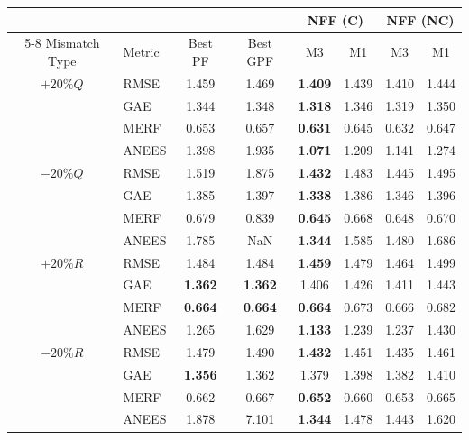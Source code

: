 \begin{Table}[ht]
	\caption{Performance under $\pm 20\%$ model mismatches. Comparison between the best PF/GPF and NFF ($L=1000$).}
	\label{tab:full_mismatch_results_v2}
	\footnotesize
	\setlength{\tabcolsep}{5pt}
	\begin{tabular}{|c|l|c|c|cc|cc|}
		\hline
		& & & & \multicolumn{2}{c|}{NFF (C)} & \multicolumn{2}{c|}{NFF (NC)} \\ \cline{5-8}
		Mismatch Type & Metric & Best PF & Best GPF & M3  & M1  & M3  & M1  \\ \hline
		
		{$+20\% Q$}
		& RMSE  & 1.459 & 1.469 & \textbf{1.409} & 1.439 & 1.410 & 1.444 \\
		& GAE   & 1.344 & 1.348 & \textbf{1.318} & 1.346 & 1.319 & 1.350 \\
		& MERF  & 0.653 & 0.657 & \textbf{0.631} & 0.645 & 0.632 & 0.647 \\
		& ANEES & 1.398 & 1.935 & \textbf{1.071} & 1.209 & 1.141 & 1.274 \\ \hline
		
		{$-20\% Q$}
		& RMSE  & 1.519 & 1.875 & \textbf{1.432} & 1.483 & 1.445 & 1.495 \\
		& GAE   & 1.385 & 1.397 & \textbf{1.338} & 1.386 & 1.346 & 1.396 \\
		& MERF  & 0.679 & 0.839 & \textbf{0.645} & 0.668 & 0.648 & 0.670 \\
		& ANEES & 1.785 & NaN   & \textbf{1.344} & 1.585 & 1.480 & 1.686 \\ \hline
		
		{$+20\% R$}
		& RMSE  & 1.484 & 1.484 & \textbf{1.459} & 1.479 & 1.464 & 1.499 \\
		& GAE   & \textbf{1.362} & \textbf{1.362} & 1.406 & 1.426 & 1.411 & 1.443 \\
		& MERF  & \textbf{0.664} & \textbf{0.664} & \textbf{0.664} & 0.673 & 0.666 & 0.682 \\
		& ANEES & 1.265 & 1.629 & \textbf{1.133} & 1.239 & 1.237 & 1.430 \\ \hline
		
		{$-20\% R$}
		& RMSE  & 1.479 & 1.490 & \textbf{1.432} & 1.451 & 1.435 & 1.461 \\
		& GAE   & \textbf{1.356} & 1.362 & 1.379 & 1.398 & 1.382 & 1.410 \\
		& MERF  & 0.662 & 0.667 & \textbf{0.652} & 0.660 & 0.653 & 0.665 \\
		& ANEES & 1.878 & 7.101 & \textbf{1.344} & 1.478 & 1.443 & 1.620 \\ \hline
		

\end{tabular}
\end{Table}
